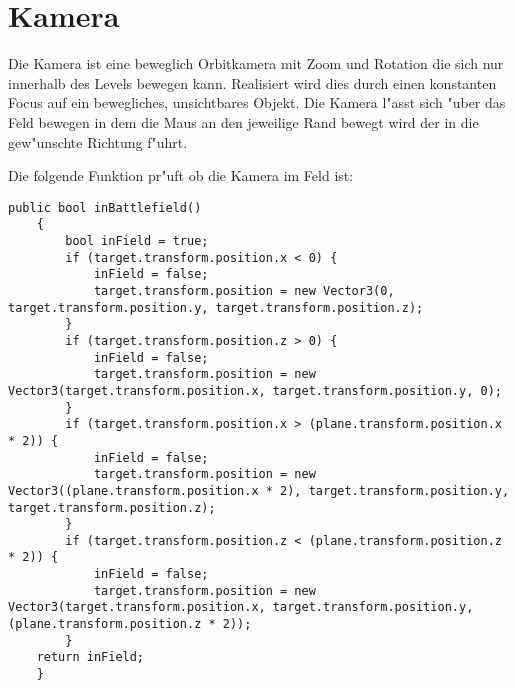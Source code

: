 \chapter{Kamera}

Die Kamera ist eine beweglich Orbitkamera mit Zoom und Rotation die sich nur innerhalb des Levels bewegen kann. Realisiert wird dies durch einen konstanten Focus auf ein bewegliches, unsichtbares Objekt. Die Kamera l"asst sich "uber das Feld bewegen in dem die Maus an den jeweilige Rand bewegt wird der in die gew"unschte Richtung f"uhrt.

Die folgende Funktion pr"uft ob die Kamera im Feld ist:

\begin{lstlisting}[breaklines = true]
	public bool inBattlefield()
	{
		bool inField = true;
		if (target.transform.position.x < 0) {
			inField = false;
			target.transform.position = new Vector3(0, target.transform.position.y, target.transform.position.z);
		}
		if (target.transform.position.z > 0) {
			inField = false;
			target.transform.position = new Vector3(target.transform.position.x, target.transform.position.y, 0);
		}
		if (target.transform.position.x > (plane.transform.position.x * 2)) {
			inField = false;
			target.transform.position = new Vector3((plane.transform.position.x * 2), target.transform.position.y, target.transform.position.z);
		}
		if (target.transform.position.z < (plane.transform.position.z * 2)) {
			inField = false;
			target.transform.position = new Vector3(target.transform.position.x, target.transform.position.y, (plane.transform.position.z * 2));
		}
	return inField;
	}
\end{lstlisting}
